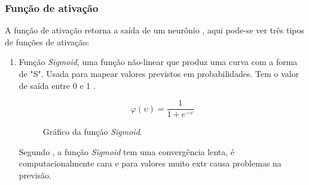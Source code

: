 \subsubsection*{Função de ativação}

A função de ativação retorna a saída de um neurônio \cite{haykin1999neural}, aqui pode-se ver três tipos de funções de ativação:

\begin{enumerate}
	\item Função \textit{Sigmoid}, uma função não-linear que produz uma curva com a forma de "S". Usada para mapear valores previstos em probabilidades. Tem o valor de saída entre 0 e 1 \cite{gharat2019what}.
	\begin{figure}[H]
	\caption{Gráfico da função \textit{Sigmoid}.}
	\begin{center}
		\begin{minipage}{0.45\textwidth}
			\begin{equation}
				\varphi(\upsilon) = \frac{1}{1 + e^{-\upsilon}}
			\end{equation}
		\end{minipage}
		\hfill
		\begin{minipage}{0.45\textwidth}
		\end{minipage}
	\end{center}
	\label{fig:grafico_sigmoid}
	\end{figure}
	Segundo , a função \textit{Sigmoid} tem uma convergência lenta, é computacionalmente cara e para valores muito extr causa problemas na previsão.


\end{enumerate}
